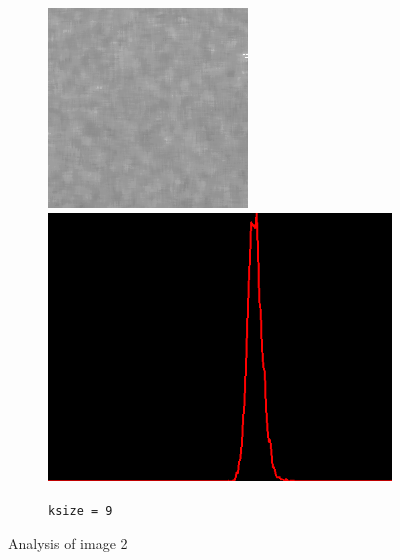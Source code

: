 \begin{figure}[H]
\begin{subfigure}[b]{0.24\textwidth}
        \includegraphics[width=\textwidth]{img2/rect_9_median_9_final_img2.png}\\[0.1cm]
        \includegraphics[width=\textwidth]{img2/hist_rect_9_median_9_final_img2.png}
        \caption{\lstinline|ksize = 9|}
        \label{fig:img2_kernel9}
    \end{subfigure}
    \caption{Analysis of image 2}\label{fig:img2}
\end{figure}

